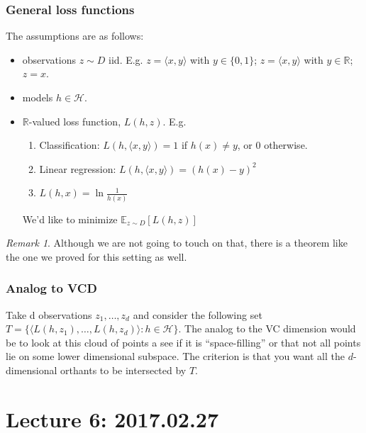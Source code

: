 \documentclass[12pt, letterpaper]{article}
\numberwithin{equation}{section} %
\newcommand{\R}{\mathbb{R}}
\newcommand{\mb}{\mathbb}
\newcommand{\mc}{\mathcal}
\theoremstyle{definition}
\theoremstyle{remark}
\newtheorem{remark}[theorem]{Remark}
\begin{document}
\subsubsection{General loss functions}
The assumptions are as follows:
\begin{itemize}
\item observations $z \sim D$ iid. E.g. $z = \langle x, y\rangle$ with $y\in\lbrace 0,1\rbrace$;  $z = \langle x, y\rangle$ with $y\in\R$; $z=x$.
\item models $h\in\mc H$.
\item $\R$-valued loss function, $L(h,z)$. E.g.
    \begin{enumerate}
    \item Classification: $L(h, \langle x,y \rangle) = 1$ if $h(x)\ne y$, or 0 otherwise.
    \item Linear regression: $L(h, \langle x,y \rangle) = (h(x)-y)^2$
    \item $L(h,x)= \ln \frac1{h(x)}$
    \end{enumerate}
     We'd like to minimize $\mb E_{z\sim D}[L(h,z)]$
\end{itemize}
\begin{remark}
    Although we are not going to touch on that, there is a theorem like the one we proved for this setting as well.
\end{remark}
\subsubsection{Analog to VCD}
Take d observations $z_1,\ldots,z_d$ and consider the following set $T=\lbrace\langle L(h, z_1),\ldots,L(h,z_d)\rangle:h\in\mc H\rbrace$. The analog to the VC dimension would be to look at this cloud of points a see if it is ``space-filling'' or that not all points lie on some lower dimensional subspace. The criterion is that you want all the $d$-dimensional orthants to be intersected by $T$.


\section{Lecture 6: 2017.02.27}
\end{document}
